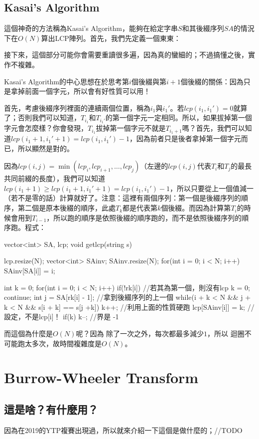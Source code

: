 		\subsection{Kasai's Algorithm}
			這個神奇的方法稱為Kasai's Algorithm，能夠在給定字串$S$和其後綴序列$SA$的情況下在$O(N)$算出LCP陣列。首先，我們先定義一個東東：
			
			接下來，這個部分可能你會需要重讀很多遍，因為真的蠻細的；不過搞懂之後，實作不複雜。
			
			Kasai's Algorithm的中心思想在於思考第$i$個後綴與第$i + 1$個後綴的關係：因為只是拿掉前面一個字元，所以會有好性質可以用！
			
			首先，考慮後綴序列裡面的連續兩個位置，稱為$i_1$與$i_1'$。若$lcp(i_1, i_1') = 0$就算了；否則我們可以知道，$T_{i_1}$和$T_{i_1'}$的第一個字元一定相同。所以，如果拔掉第一個字元會怎麼樣？你會發現，$T_{i_1}$拔掉第一個字元不就是$T_{i_1 + 1}$嗎？首先，我們可以知道$lcp(i_1 + 1, i_1' + 1) = lcp(i_1, i_1') - 1$，因為前者只是後者拿掉第一個字元而已，所以顯然是對的。
			
			因為$lcp(i, j) = \min(lcp_i, lcp_{i + 1}, \dots, lcp_{j})$（左邊的$lcp(i, j)$代表$T_i$和$T_j$的最長共同前綴的長度），我們可以知道$lcp(i_1 + 1) \geq lcp(i_1 + 1, i_1' + 1) =lcp(i_1, i_1') - 1$，所以只要從上一個值減一（若不是零的話）計算就好了。注意：這裡有兩個序列：第一個是後綴序列的順序，第二個是原本後綴的順序，此處$T_k$都是代表第$k$個後綴。而因為計算第$T_i$的時候會用到$T_{i -1 }$，所以跑的順序是依照後綴的順序跑的，而不是依照後綴序列的順序跑。程式：
			\begin{C++}
vector<int> SA, lcp;
void getlcp(string s){
	lcp.resize(N);
	vector<int> SAinv;
	SAinv.resize(N);
	for(int i = 0; i < N; i++){
		SAinv[SA[i]] = i;
	}

	int k = 0;
	for(int i = 0; i < N; i++){
		if(!rk[i]){ //若其為第一個，則沒有lcp
			k = 0;
			continue;
		}
		int j = SA[rk[i] - 1]; //拿到後綴序列的上一個
		while(i + k < N && j + k < N && s[i + k] == s[j +k])  		
			k++;  //利用上面的性質硬跑
		lcp[SAinv[i]] = k; //設定，不是lcp[i]！
		if(k) k--; //界是 -1
	}
}
			\end{C++}
		而這個為什麼是$O(N)$呢？因為 除了一次之外，每次都最多減少$1$，所以 迴圈不可能跑太多次，故時間複雜度是$O(N)$。
\section{Burrow-Wheeler Transform}
	\subsection{這是啥？有什麼用？}
		因為在2019的YTP複賽出現過，所以就來介紹一下這個是做什麼的；//TODO

